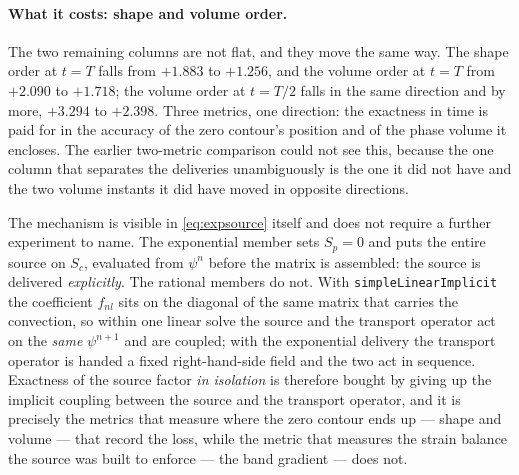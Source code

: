 \documentclass[preprint,3p,11pt]{elsarticle}
\newcommand{\psilev}{\psi}
\begin{document}
\paragraph{What it costs: shape and volume order.} The two remaining columns are
not flat, and they move the same way. The shape order at $t=T$ falls from $+1.883$
to $+1.256$, and the volume order at $t=T$ from $+2.090$ to $+1.718$; the volume
order at $t=T/2$ falls in the same direction and by more, $+3.294$ to $+2.398$.
Three metrics, one direction: the exactness in time is paid for in the accuracy of
the zero contour's position and of the phase volume it encloses. The earlier
two-metric comparison could not see this, because the one column that separates
the deliveries unambiguously is the one it did not have and the two volume
instants it did have moved in opposite directions.

The mechanism is visible in \eqref{eq:expsource} itself and does not require a
further experiment to name. The exponential member sets $S_p = 0$ and puts the
entire source on $S_c$, evaluated from $\psilev^n$ before the matrix is assembled:
the source is delivered \emph{explicitly}. The rational members do not. With
\texttt{simpleLinearImplicit} the coefficient $f_{nl}$ sits on the diagonal of the
same matrix that carries the convection, so within one linear solve the source and
the transport operator act on the \emph{same} $\psilev^{n+1}$ and are coupled;
with the exponential delivery the transport operator is handed a fixed
right-hand-side field and the two act in sequence. Exactness of the source factor
\emph{in isolation} is therefore bought by giving up the implicit coupling between
the source and the transport operator, and it is precisely the metrics that
measure where the zero contour ends up --- shape and volume --- that record the
loss, while the metric that measures the strain balance the source was built to
enforce --- the band gradient --- does not.
\end{document}
